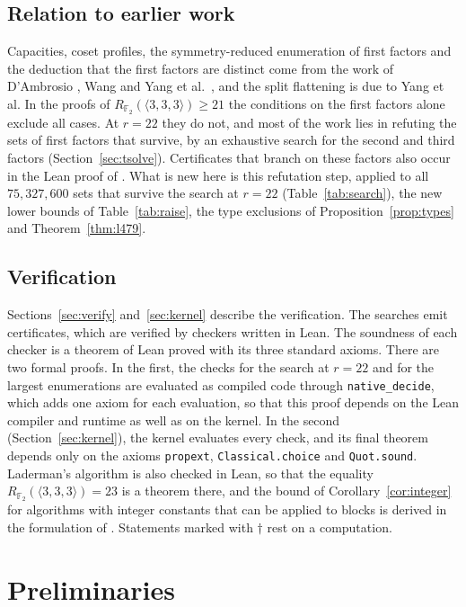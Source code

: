\documentclass[11pt]{amsart}
\theoremstyle{definition}
\theoremstyle{remark}
\numberwithin{equation}{section}
\newcommand{\F}{\mathbb{F}_2}
\newcommand{\mm}{\langle 3,3,3\rangle}
\begin{document}
\subsection*{Relation to earlier work}
Capacities, coset profiles, the symmetry-reduced enumeration of first factors and the deduction that the first factors are distinct come from the work of D'Ambrosio \cite{DAm26}, Wang \cite{Wan26a,Wan26b} and Yang et al.\ \cite{Yan26}, and the split flattening is due to Yang et al. In the proofs of $R_{\F}(\mm)\ge 21$ the conditions on the first factors alone exclude all cases. At $r=22$ they do not, and most of the work lies in refuting the sets of first factors that survive, by an exhaustive search for the second and third factors (Section~\ref{sec:tsolve}). Certificates that branch on these factors also occur in the Lean proof of \cite{RR26}. What is new here is this refutation step, applied to all $75{,}327{,}600$ sets that survive the search at $r=22$ (Table~\ref{tab:search}), the new lower bounds of Table~\ref{tab:raise}, the type exclusions of Proposition~\ref{prop:types} and Theorem~\ref{thm:l479}.

\subsection*{Verification}
Sections~\ref{sec:verify} and~\ref{sec:kernel} describe the verification. The searches emit certificates, which are verified by checkers written in Lean. The soundness of each checker is a theorem of Lean proved with its three standard axioms. There are two formal proofs. In the first, the checks for the search at $r=22$ and for the largest enumerations are evaluated as compiled code through \texttt{native\_decide}, which adds one axiom for each evaluation, so that this proof depends on the Lean compiler and runtime as well as on the kernel. In the second (Section~\ref{sec:kernel}), the kernel evaluates every check, and its final theorem depends only on the axioms \texttt{propext}, \texttt{Classical.choice} and \texttt{Quot.sound}. Laderman's algorithm is also checked in Lean, so that the equality $R_{\F}(\mm)=23$ is a theorem there, and the bound of Corollary~\ref{cor:integer} for algorithms with integer constants that can be applied to blocks is derived in the formulation of \cite{RR26}. Statements marked with $\dagger$ rest on a computation.

\section{Preliminaries}\label{sec:prelim}
\end{document}

